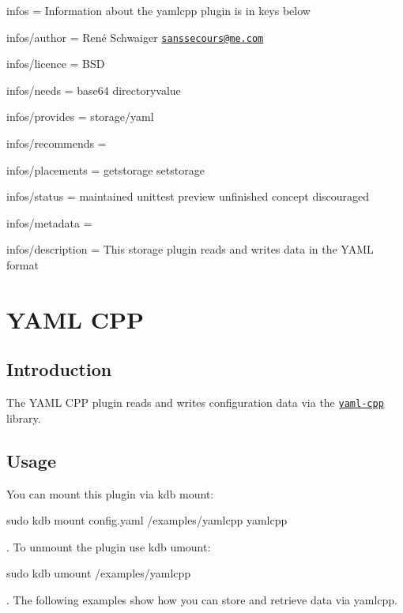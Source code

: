
\begin{DoxyItemize}
\item infos = Information about the yamlcpp plugin is in keys below
\item infos/author = René Schwaiger \href{mailto:sanssecours@me.com}{\tt sanssecours@me.\+com}
\item infos/licence = B\+SD
\item infos/needs = base64 directoryvalue
\item infos/provides = storage/yaml
\item infos/recommends =
\item infos/placements = getstorage setstorage
\item infos/status = maintained unittest preview unfinished concept discouraged
\item infos/metadata =
\item infos/description = This storage plugin reads and writes data in the Y\+A\+ML format
\end{DoxyItemize}\hypertarget{md_src_plugins_yamlcpp_README_src_plugins_yamlcpp_README_md}{}\section{Y\+A\+M\+L C\+PP}\label{md_src_plugins_yamlcpp_README_src_plugins_yamlcpp_README_md}
\subsection*{Introduction}

The Y\+A\+ML C\+PP plugin reads and writes configuration data via the \href{https://github.com/jbeder/yaml-cpp}{\tt yaml-\/cpp} library.

\subsection*{Usage}

You can mount this plugin via {\ttfamily kdb mount}\+:


\begin{DoxyCode}
sudo kdb mount config.yaml /examples/yamlcpp yamlcpp
\end{DoxyCode}


. To unmount the plugin use {\ttfamily kdb umount}\+:


\begin{DoxyCode}
sudo kdb umount /examples/yamlcpp
\end{DoxyCode}


. The following examples show how you can store and retrieve data via {\ttfamily yamlcpp}.

